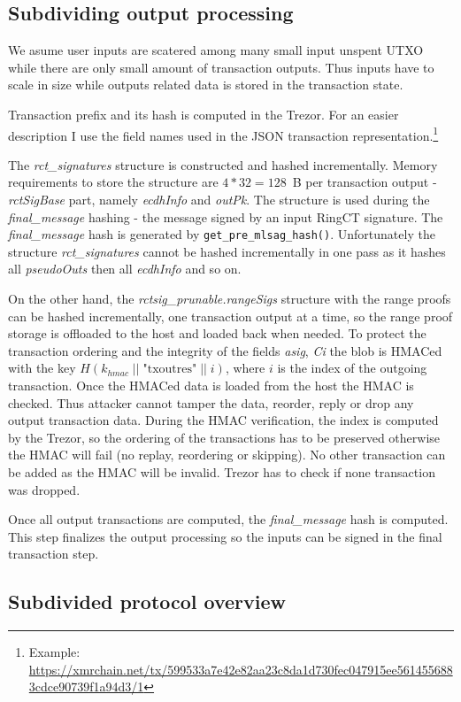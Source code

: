 \documentclass[]{article}
\begin{document}
\subsection{Subdividing output processing}
We asume user inputs are scatered among many small input unspent UTXO while there are only small amount of transaction outputs. Thus inputs have to scale in size while outputs related data is stored in the transaction state.

Transaction prefix and its hash is computed in the Trezor.
For an easier description I use the field names used in the JSON transaction representation.\footnote{Example: \url{https://xmrchain.net/tx/599533a7e42e82aa23c8da1d730fec047915ee5614556883cdce90739f1a94d3/1}}

The \emph{rct\_signatures} structure is constructed and hashed incrementally. Memory requirements to store the structure are $4 * 32 = 128$~B per transaction output - \emph{rctSigBase} part, namely \emph{ecdhInfo} and \emph{outPk}. The structure is used during the \emph{final\_message} hashing - the message signed by an input RingCT signature. The \emph{final\_message} hash is generated by \verb|get_pre_mlsag_hash()|. Unfortunately the structure \emph{rct\_signatures} cannot be hashed incrementally in one pass as it hashes all \emph{pseudoOuts} then all \emph{ecdhInfo} and so on.

On the other hand, the \emph{rctsig\_prunable.rangeSigs} structure with the range proofs can be hashed incrementally, one transaction output at a time, so the range proof storage is offloaded to the host and loaded back when needed. To protect the transaction ordering and the integrity of the fields \emph{asig}, \emph{Ci} the blob is HMACed with the key $H(k_{hmac} \; || \; \text{"txoutres"} \; || \; i)$, where $i$ is the index of the outgoing transaction. Once the HMACed data is loaded from the host the HMAC is checked. Thus attacker cannot tamper the data, reorder, reply or drop any output transaction data. During the HMAC verification, the index is computed by the Trezor, so the ordering of the transactions has to be preserved otherwise the HMAC will fail (no replay, reordering or skipping). No other transaction can be added as the HMAC will be invalid. Trezor has to check if none transaction was dropped.

Once all output transactions are computed, the \emph{final\_message} hash is computed. This step finalizes the output processing so the inputs can be signed in the final transaction step.

\subsection{Subdivided protocol overview}
\end{document}
